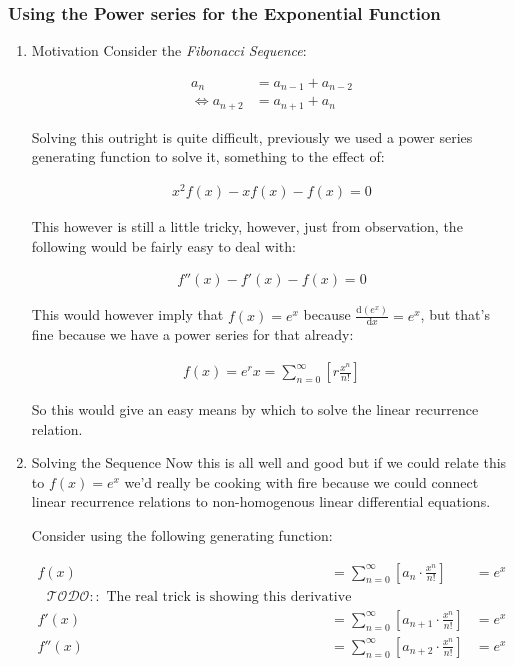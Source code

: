 \documentclass[11pt]{article}
\begin{document}
\subsubsection{Using the Power series for the Exponential Function}
\label{sec:orgbcf1a0b}
\begin{enumerate}
\item Motivation
\label{sec:org3874f38}
Consider the \emph{Fibonacci Sequence}:


\begin{align*}
    a_{n}&= a_{n - 1} + a_{n - 2}\\
\iff a_{n+  2} &= a_{n+  1} +  a_n
\end{align*}


Solving this outright is quite difficult, previously we used a power
series generating function to solve it, something to the effect of:


\begin{align*}
x^2 f\left( x \right) -  x f \left( x \right) -  f\left( x \right)=  0
\end{align*}


This however is still a little tricky, however, just from observation,
the following would be fairly easy to deal with:


\begin{align*}
f''\left( x \right)- f'\left( x \right)- f\left( x \right)=  0
\end{align*}


This would however imply that \(f\left( x \right)= e^x\) because
\(\frac{\mathrm{d}\left( e^x \right) }{\mathrm{d} x} = e^x\), but that's
fine because we have a power series for that already:


\begin{align*}
f\left( x \right)= e^rx = \sum^{\infty}_{n= 0}   \left[ r \frac{x^n}{n!} \right]
\end{align*}


So this would give an easy means by which to solve the linear recurrence
relation.

\item Solving the Sequence
\label{sec:org9275af1}
Now this is all well and good but if we could relate this to \(f(x)=e^x\)
we'd really be cooking with fire because we could connect linear
recurrence relations to non-homogenous linear differential equations.

Consider using the following generating function:


\begin{align*}
    f\left( x \right) &=  \sum^{\infty}_{n= 0}   \left[ a_{n} \cdot  \frac{x^n}{n!} \right]   &= e^x \\
    \text{ $\mathcal{TODO::}$ The real trick is showing this derivative property } \\
    f'\left( x \right) &=  \sum^{\infty}_{n= 0}   \left[ a_{n+1} \cdot  \frac{x^n}{n!} \right]  &= e^x \\
    f''\left( x \right) &=  \sum^{\infty}_{n= 0}   \left[ a_{n+2} \cdot  \frac{x^n}{n!} \right] &= e^x \\
\end{align*}



\end{enumerate}
\end{document}
